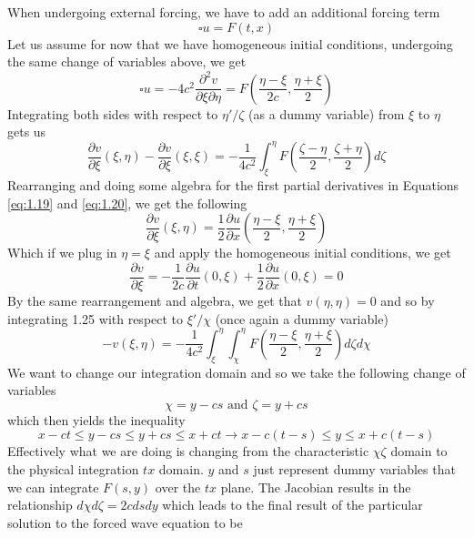 \documentclass{article}
\newcommand{\pd}[2]{\frac{\partial #1}{\partial #2}}
\theoremstyle{definition}
\begin{document}
When undergoing external forcing, we have to add an additional forcing term 
\begin{equation*}
    \square u=F(t,x)
\end{equation*}
Let us assume for now that we have homogeneous initial conditions, undergoing the same change of variables above, we get 
\begin{equation*}
    \square u=-4c^2\frac{\partial^2v}{\partial\xi\partial\eta}=F\left(\frac{\eta-\xi}{2c},\frac{\eta+\xi}{2}\right)
\end{equation*}
Integrating both sides with respect to $\eta' /\zeta$ (as a dummy variable) from $\xi$ to $\eta$ gets us
\begin{equation*}
    \pd{v}{\xi}(\xi,\eta)-\pd{v}{\xi}(\xi,\xi) = -\frac{1}{4c^2}\int^\eta_\xi F\left(\frac{\zeta-\eta}{2},\frac{\zeta+\eta}{2}\right)d\zeta
\end{equation*}
Rearranging and doing some algebra for the first partial derivatives in Equations \eqref{eq:1.19} and \eqref{eq:1.20}, we get the following
\begin{equation}
    \pd{v}{\xi}(\xi,\eta)=\frac{1}{2}\pd{u}{x}\left(\frac{\eta-\xi}{2},\frac{\eta+\xi}{2}\right)\label{eq:1.25}
\end{equation}
Which if we plug in $\eta=\xi$ and apply the homogeneous initial conditions, we get 
\begin{equation*}
    \pd{v}{\xi}=-\frac{1}{2c}\pd{u}{t}(0,\xi) + \frac{1}{2}\pd{u}{x}(0,\xi) = 0
\end{equation*}
By the same rearrangement and algebra, we get that $v(\eta,\eta)=0$ and so by integrating 1.25 with respect to $\xi'/\chi$ (once again a dummy variable)
\begin{equation}
    -v(\xi,\eta)=-\frac{1}{4c^2}\int^\eta_\xi\int^\eta_\chi F\left(\frac{\eta-\xi}{2},\frac{\eta+\xi}{2}\right)d\zeta d\chi
\end{equation}
We want to change our integration domain and so we take the following change of variables
\begin{equation*}
    \chi=y-cs \text{ and } \zeta=y+cs
\end{equation*}
which then yields the inequality
\begin{equation*}
    x-ct \leq y-cs \leq y+cs \leq x+ct \rightarrow x-c(t-s)\leq y \leq x+c(t-s)    
\end{equation*}
Effectively what we are doing is changing from the characteristic $\chi\zeta$ domain to the physical integration $tx$ domain. $y$ and $s$ just represent dummy variables that we can integrate $F(s,y)$ over the $tx$ plane. The Jacobian results in the relationship $d\chi d\zeta = 2c dsdy$ which leads to the final result of the particular solution to the forced wave equation to be 
\end{document}
